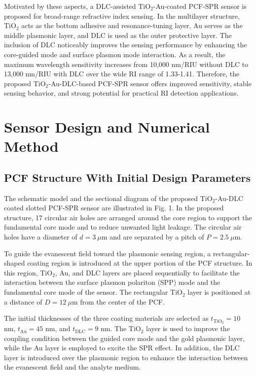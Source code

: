 \documentclass[preprint,12pt]{elsarticle}
\begin{document}
Motivated by these aspects, a DLC-assisted TiO$_2$-Au-coated PCF-SPR sensor is proposed for broad-range refractive index sensing. In the multilayer structure, TiO$_2$ acts as the bottom adhesive and resonance-tuning layer, Au serves as the middle plasmonic layer, and DLC is used as the outer protective layer. The inclusion of DLC noticeably improves the sensing performance by enhancing the core-guided mode and surface plasmon mode interaction. As a result, the maximum wavelength sensitivity increases from 10,000 nm/RIU without DLC to 13,000 nm/RIU with DLC over the wide RI range of 1.33-1.41. Therefore, the proposed TiO$_2$-Au-DLC-based PCF-SPR sensor offers improved sensitivity, stable sensing behavior, and strong potential for practical RI detection applications.
\section{\textbf{{Sensor Design and Numerical Method}}}



\subsection{\textbf{{PCF Structure With Initial Design Parameters}}}

The schematic model and the sectional diagram of the proposed TiO$_2$-Au-DLC coated slotted PCF-SPR sensor are illustrated in Fig. 1. In the proposed structure, 17 circular air holes are arranged around the core region to support the fundamental core mode and to reduce unwanted light leakage. The circular air holes have a diameter of $d = 3~\mu$m and are separated by a pitch of $P = 2.5~\mu$m.

To guide the evanescent field toward the plasmonic sensing region, a rectangular-shaped coating region is introduced at the upper portion of the PCF structure. In this region, TiO$_2$, Au, and DLC layers are placed sequentially to facilitate the interaction between the surface plasmon polariton (SPP) mode and the fundamental core mode of the sensor. The rectangular TiO$_2$ layer is positioned at a distance of $D = 12~\mu$m from the center of the PCF.

The initial thicknesses of the three coating materials are selected as $t_{\mathrm{TiO_2}} = 10$ nm, $t_{\mathrm{Au}} = 45$ nm, and $t_{\mathrm{DLC}} = 9$ nm. The TiO$_2$ layer is used to improve the coupling condition between the guided core mode and the gold plasmonic layer, while the Au layer is employed to excite the SPR effect. In addition, the DLC layer is introduced over the plasmonic region to enhance the interaction between the evanescent field and the analyte medium.
\end{document}
